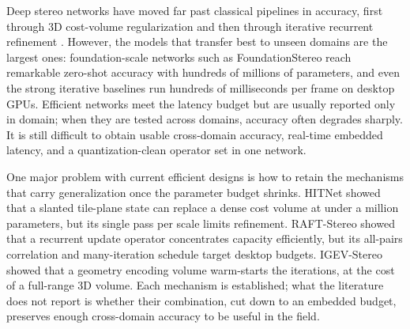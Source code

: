 \documentclass[conference]{IEEEtran}
\begin{document}
Deep stereo networks have moved far past classical pipelines \cite{scharstein2002taxonomy,hirschmuller2008sgm,zbontar2016mccnn} in accuracy, first through 3D cost-volume regularization \cite{kendall2017gcnet,chang2018psmnet,guo2019gwcnet,zhang2019ganet} and then through iterative recurrent refinement \cite{lipson2021raftstereo,li2022crestereo,xu2023igev,wang2024selective}. However, the models that transfer best to unseen domains are the largest ones: foundation-scale networks such as FoundationStereo \cite{wen2025foundationstereo} reach remarkable zero-shot accuracy with hundreds of millions of parameters, and even the strong iterative baselines run hundreds of milliseconds per frame on desktop GPUs. Efficient networks \cite{khamis2018stereonet,wang2019anynet,tonioni2019madnet,duggal2019deeppruner,xu2021bgnet,bangunharcana2021coex,tankovich2021hitnet,shamsafar2022mobilestereonet,guo2025lightstereo} meet the latency budget but are usually reported only in domain; when they are tested across domains, accuracy often degrades sharply. It is still difficult to obtain usable cross-domain accuracy, real-time embedded latency, and a quantization-clean operator set in one network.

One major problem with current efficient designs is how to retain the mechanisms that carry generalization once the parameter budget shrinks. HITNet \cite{tankovich2021hitnet} showed that a slanted tile-plane state can replace a dense cost volume at under a million parameters, but its single pass per scale limits refinement. RAFT-Stereo \cite{lipson2021raftstereo} showed that a recurrent update operator concentrates capacity efficiently, but its all-pairs correlation and many-iteration schedule target desktop budgets. IGEV-Stereo \cite{xu2023igev} showed that a geometry encoding volume warm-starts the iterations, at the cost of a full-range 3D volume. Each mechanism is established; what the literature does not report is whether their combination, cut down to an embedded budget, preserves enough cross-domain accuracy to be useful in the field.
\end{document}

